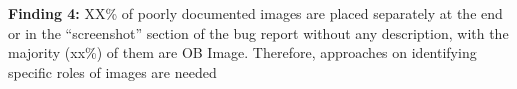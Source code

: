 






\begin{tcolorbox}[colback=gray!5, colframe=black, ]
{\bf Finding 4:}  {
%
XX\% of poorly documented images are placed separately at the end  or in the “screenshot” section of the bug report without any description, with the majority (xx\%) of them are OB Image. Therefore, approaches on identifying specific roles of images are needed
}
\end{tcolorbox}


